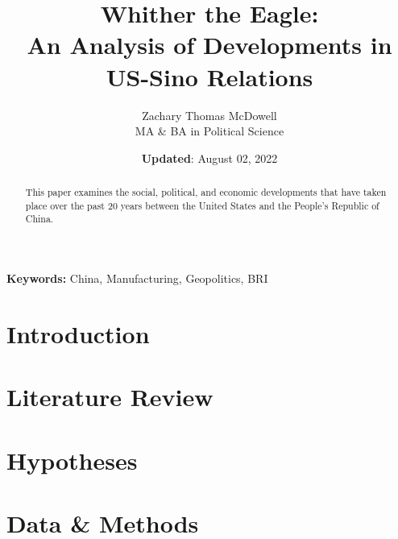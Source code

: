 \documentclass[
  11pt,
]{article}
\title{Whither the Eagle:\\
An Analysis of Developments in US-Sino Relations}
\author{Zachary Thomas McDowell\\
MA \& BA in Political Science}
\date{\textbf{Updated}: August 02, 2022}
\providecommand{\keywords}[1]{\textbf{Keywords:} #1}
\begin{document}
\maketitle
\begin{abstract}
\singlespace This paper examines the social, political, and economic
developments that have taken place over the past 20 years between the
United States and the People's Republic of China.
\end{abstract}

\keywords{China, Manufacturing, Geopolitics, BRI}

\let\thefootnote\relax\footnotetext{\lipsum[1][1-7]}

\thispagestyle{empty}

\newpage
{}

\thispagestyle{TOC}
\tableofcontents
\listoffigures
\listoftables
\clearpage
\newpage


\thispagestyle{INTRODUCTION}
\clearpage


\hypertarget{introduction}{%
\section*{Introduction}\label{introduction}}

\lipsum[4-7]

\hypertarget{literature-review}{%
\section{Literature Review}\label{literature-review}}

\lipsum[4-7]

\hypertarget{hypotheses}{%
\section{Hypotheses}\label{hypotheses}}

\lipsum[4-7]

\hypertarget{data-methods}{%
\section{Data \& Methods}\label{data-methods}}

\lipsum[4-7]
\end{document}
